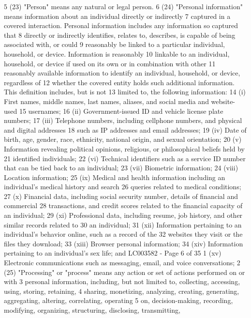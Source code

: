 5 (23) "Person" means any natural or legal person.
6 (24) "Personal information" means information about an individual directly or indirectly
7 captured in a covered interaction. Personal information includes any information so captured that
8 directly or indirectly identifies, relates to, describes, is capable of being associated with, or could
9 reasonably be linked to a particular individual, household, or device. Information is reasonably
10 linkable to an individual, household, or device if used on its own or in combination with other
11 reasonably available information to identify an individual, household, or device, regardless of
12 whether the covered entity holds such additional information. This definition includes, but is not
13 limited to, the following information:
14 (i) First names, middle names, last names, aliases, and social media and website-used
15 usernames;
16 (ii) Government-issued ID and vehicle license plate numbers;
17 (iii) Telephone numbers, including cellphone numbers, and physical and digital addresses
18 such as IP addresses and email addresses;
19 (iv) Date of birth, age, gender, race, ethnicity, national origin, and sexual orientation;
20 (v) Information revealing political opinions, religious, or philosophical beliefs held by
21 identified individuals;
22 (vi) Technical identifiers such as a service ID number that can be tied back to an individual;
23 (vii) Biometric information;
24 (viii) Location information;
25 (ix) Medical and health information including an individual's medical history and search
26 queries related to medical conditions;
27 (x) Financial data, including social security number, details of financial and commercial
28 transactions, and credit scores related to the financial capacity of an individual;
29 (xi) Professional data, including resume, job history, and other similar records related to
30 an individual;
31 (xii) Information pertaining to an individual's behavior online, such as a record of the
32 websites they visit or the files they download;
33 (xiii) Browser personal information;
34 (xiv) Information pertaining to an individual's sex life; and
LC003582 - Page 6 of 35
1 (xv) Electronic communications such as messaging, email, and voice conversations;
2 (25) "Processing" or "process" means any action or set of actions performed on or with
3 personal information, including, but not limited to, collecting, accessing, using, storing, retaining,
4 sharing, monetizing, analyzing, creating, generating, aggregating, altering, correlating, operating
5 on, decision-making, recording, modifying, organizing, structuring, disclosing, transmitting,
